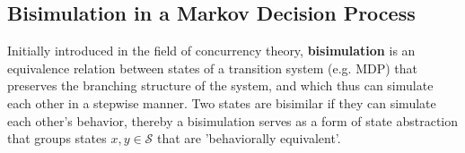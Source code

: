 








\subsection{Bisimulation in a Markov Decision Process}
Initially introduced in the field of concurrency theory, \textbf{bisimulation} \cite{li2006towards, abate2024bisimulation, baier2008principles} is an equivalence relation between states of a transition system (e.g. MDP) that preserves the branching structure of the system, and which thus can simulate each other in a stepwise manner. Two states are bisimilar if they can simulate each other's behavior, thereby a bisimulation serves as a form of state abstraction that groups states $x, y \in \mathcal{S}$  that are 'behaviorally equivalent'. 


